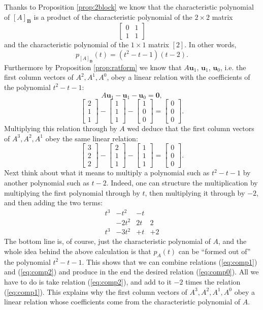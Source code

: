 \documentclass[12pt]{article}
\newcommand{\vu}{\mathbf{u}}
\newcommand{\vzero}{\mathbf{0}}
\newcommand{\bB}{{\mathbf{B}}}
\newcommand{\lb}{\left[}
\newcommand{\rb}{\right]}
\newcommand{\bvector}[1]{\lb\begin{array}{r} #1 \end{array}\rb}
\begin{document}
Thanks to Proposition \ref{prop:2block} we know that the
characteristic polynomial of $[A]_\bB$ is a product of the
characteristic polynomial of  the $2\times 2$ matrix
$$\lb\begin{array}{rr} 0 & 1 \\ 1 & 1 \end{array}\rb$$
and the characteristic polynomial of the $1\times 1$ matrix $[2]$.  In
other words,
$$p_{[A]_\bB}(t) = (t^2-t-1)(t-2).$$
Furthermore by Proposition
\ref{prop:ratform} we know that $A\vu_1$, $\vu_1$, $\vu_0$, i.e.  the
first column vectors of $A^2, A^1, A^0$, obey a linear relation with
the coefficients of the polynomial $t^2-t-1$:
$$A\vu_1 - \vu_1 - \vu_0 = \vzero,$$
\begin{equation}
\label{eq:comp1}
\bvector{2\\1\\1}
-\bvector{1\\1\\1}
-\bvector{1\\0\\0}
=
\bvector{0\\0\\0}.
\end{equation}
Multiplying this relation through by $A$ wed deduce that the first
column vectors of $A^3, A^2, A^1$ obey the same linear relation:
\begin{equation}
  \label{eq:comp2}
\bvector{3\\2\\2} 
-\bvector{2\\1\\1}
-\bvector{1\\1\\1}
=
\bvector{0\\0\\0}.
\end{equation}
Next think about what it means to multiply a polynomial such as
$t^2-t-1$ by another polynomial such as $t-2$.  Indeed, one can
structure the multiplication by multiplying the first polynomial
through by $t$, then multiplying it through by $-2$, and then adding
the two terms:
$$
\begin{array}{cccc}
t^3 & - t^2 & -t \\
& -2t^2 & 2t & 2\\
\hline
t^3 & - 3t^2 &+ t& + 2
\end{array}
$$
The bottom line is, of course, just the characteristic polynomial
of $A$, and the whole idea behind the above calculation is that
$p_A(t)$ can be ``formed out of'' the polynomial $t^2-t-1$.  This
shows that we can combine relations (\ref{eq:comp1}) and
(\ref{eq:comp2}) and produce in the end the desired relation
(\ref{eq:comp0}).  All we have to do is take relation (\ref{eq:comp2}),
and add to it $-2$ times the relation (\ref{eq:comp1}).  This explains
why the first column vectors of $A^3, A^2, A^1, A^0$ obey a linear
relation whose coefficients come from the characteristic polynomial of
$A$.
\end{document}
